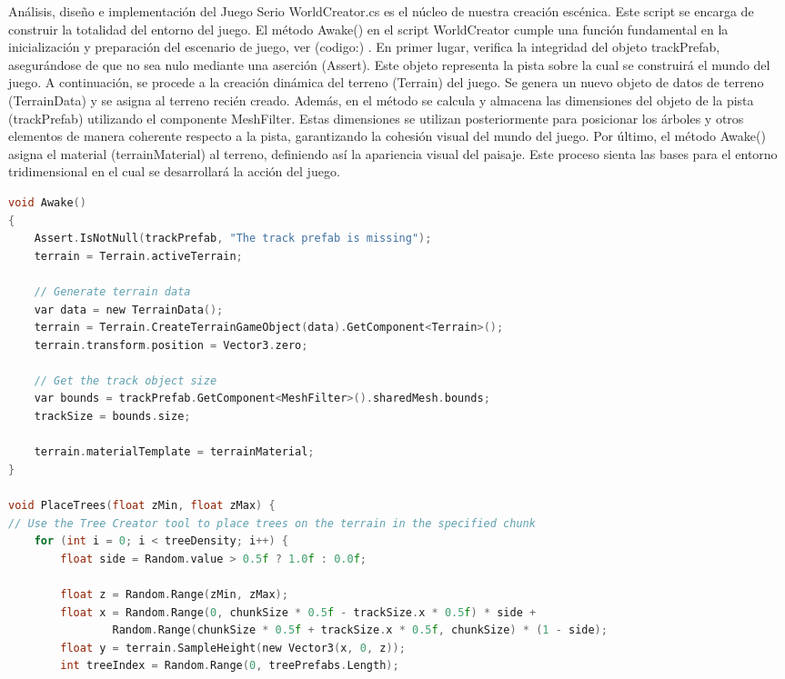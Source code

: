 \begin{thesischapter}{2} {Análisis, diseño e implementación del Juego Serio}
    \vspace{10pt}
    WorldCreator.cs es el núcleo de nuestra creación escénica. Este script se encarga de construir la totalidad del entorno del 
    juego. El método Awake() en el script WorldCreator cumple una función fundamental en la inicialización y preparación del escenario 
    de juego, ver (codigo:) . En primer lugar, verifica la integridad del objeto trackPrefab, asegurándose de que no sea nulo mediante una aserción (Assert).
    Este objeto representa la pista sobre la cual se construirá el mundo del juego. A continuación, se procede a la creación dinámica del terreno 
    (Terrain) del juego. Se genera un nuevo objeto de datos de terreno (TerrainData) y se asigna al terreno recién creado. Además, en el método se 
    calcula y almacena las dimensiones del objeto de la pista (trackPrefab) utilizando el componente MeshFilter. Estas dimensiones 
    se utilizan posteriormente para posicionar los árboles y otros elementos de manera coherente respecto a la pista, garantizando la cohesión visual 
    del mundo del juego. Por último, el método Awake() asigna el material (terrainMaterial) al terreno, definiendo así la apariencia visual del paisaje.
    Este proceso sienta las bases para el entorno tridimensional en el cual se desarrollará la acción del juego.


\begin{center}
\begin{minipage}{0.82\textwidth}
\begin{lstlisting}[language=c, label={hola}]
void Awake() 
{
    Assert.IsNotNull(trackPrefab, "The track prefab is missing");
    terrain = Terrain.activeTerrain;
        
    // Generate terrain data
    var data = new TerrainData();
    terrain = Terrain.CreateTerrainGameObject(data).GetComponent<Terrain>();
    terrain.transform.position = Vector3.zero;
        
    // Get the track object size
    var bounds = trackPrefab.GetComponent<MeshFilter>().sharedMesh.bounds;
    trackSize = bounds.size;
        
    terrain.materialTemplate = terrainMaterial;
}

void PlaceTrees(float zMin, float zMax) {
// Use the Tree Creator tool to place trees on the terrain in the specified chunk        
    for (int i = 0; i < treeDensity; i++) {
        float side = Random.value > 0.5f ? 1.0f : 0.0f;

        float z = Random.Range(zMin, zMax);            
        float x = Random.Range(0, chunkSize * 0.5f - trackSize.x * 0.5f) * side +
                Random.Range(chunkSize * 0.5f + trackSize.x * 0.5f, chunkSize) * (1 - side);
        float y = terrain.SampleHeight(new Vector3(x, 0, z));            
        int treeIndex = Random.Range(0, treePrefabs.Length);
        

\end{lstlisting}
\end{minipage}
\end{center}
\end{thesischapter}
